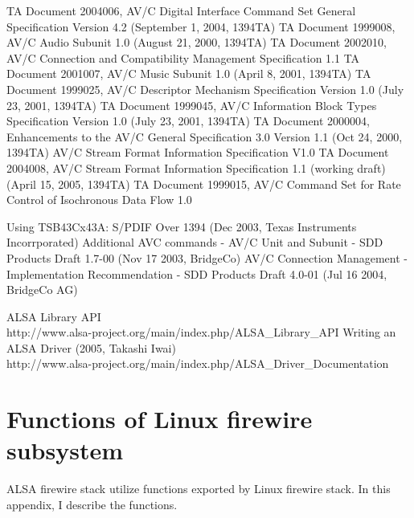 \documentclass[onecolumn]{article}
\begin{document}
\begin{thebibliography}{99}
TA Document 2004006, AV/C Digital Interface Command Set General Specification Version 4.2 (September 1, 2004, 1394TA)
TA Document 1999008, AV/C Audio Subunit 1.0 (August 21, 2000, 1394TA)
TA Document 2002010, AV/C Connection and Compatibility Management Specification 1.1
TA Document 2001007, AV/C Music Subunit 1.0 (April 8, 2001, 1394TA)
TA Document 1999025, AV/C Descriptor Mechanism Specification Version 1.0 (July 23, 2001, 1394TA)
TA Document 1999045, AV/C Information Block Types Specification Version 1.0 (July 23, 2001, 1394TA)
TA Document 2000004, Enhancements to the AV/C General Specification 3.0 Version 1.1 (Oct 24, 2000, 1394TA)
AV/C Stream Format Information Specification V1.0
TA Document 2004008, AV/C Stream Format Information Specification 1.1 (working draft) (April 15, 2005, 1394TA)
TA Document 1999015, AV/C Command Set for Rate Control of Isochronous Data Flow 1.0

Using TSB43Cx43A: S/PDIF Over 1394 (Dec 2003, Texas Instruments Incorrporated)
Additional AVC commands - AV/C Unit and Subunit - SDD Products Draft 1.7-00 (Nov 17 2003, BridgeCo)
AV/C Connection Management - Implementation Recommendation - SDD Products Draft 4.0-01 (Jul 16 2004, BridgeCo AG)

ALSA Library API \\
http://www.alsa-project.org/main/index.php/ALSA\_Library\_API
Writing an ALSA Driver (2005, Takashi Iwai) \\
http://www.alsa-project.org/main/index.php/ALSA\_Driver\_Documentation

\end{thebibliography}

\newpage

\appendix


\section{Functions of Linux firewire subsystem}

ALSA firewire stack utilize functions exported by Linux firewire stack. In this appendix, I describe the functions.
\end{document}
